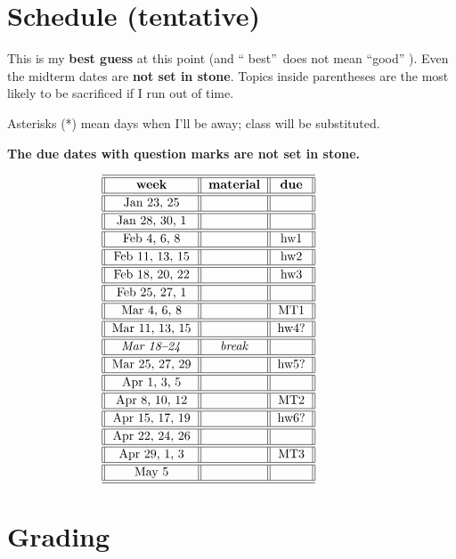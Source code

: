 \documentclass[numbers=enddot,12pt,final,onecolumn,notitlepage]{scrartcl}%
\theoremstyle{definition}
\newenvironment{noncompile}{}{}
\begin{document}
\section{Schedule (tentative)}

\begin{noncompile}
This is my \textbf{best guess} at this point (and \textquotedblleft
best\textquotedblright\ does not mean \textquotedblleft good\textquotedblright%
). Even the midterm dates are \textbf{not set in stone}. Topics inside
parentheses are the most likely to be sacrificed if I run out of time.

Asterisks (*) mean days when I'll be away; class will be substituted.
\end{noncompile}

\textbf{The due dates with question marks are not set in stone.}%

\[%
\begin{tabular}
[c]{||c||c||c||}\hline\hline
\textbf{week} & \textbf{material} & \textbf{due}\\\hline\hline
Jan 23, 25 &  & \\\hline\hline
Jan 28, 30, 1 &  & \\\hline\hline
Feb 4, 6, 8 &  & hw1\\\hline\hline
Feb 11, 13, 15 &  & hw2\\\hline\hline
Feb 18, 20, 22 &  & hw3\\\hline\hline
Feb 25, 27, 1 &  & \\\hline\hline
Mar 4, 6, 8 &  & MT1\\\hline\hline
Mar 11, 13, 15 &  & hw4?\\\hline\hline
\textit{Mar 18--24} & \textit{break} & \\\hline\hline
Mar 25, 27, 29 &  & hw5?\\\hline\hline
Apr 1, 3, 5 &  & \\\hline\hline
Apr 8, 10, 12 &  & MT2\\\hline\hline
Apr 15, 17, 19 &  & hw6?\\\hline\hline
Apr 22, 24, 26 &  & \\\hline\hline
Apr 29, 1, 3 &  & MT3\\\hline\hline
May 5 &  & \\\hline\hline
\end{tabular}
\ \ \ \ \ \ \ \ \ \ \
\]


\bigskip

\section{Grading}
\end{document}
